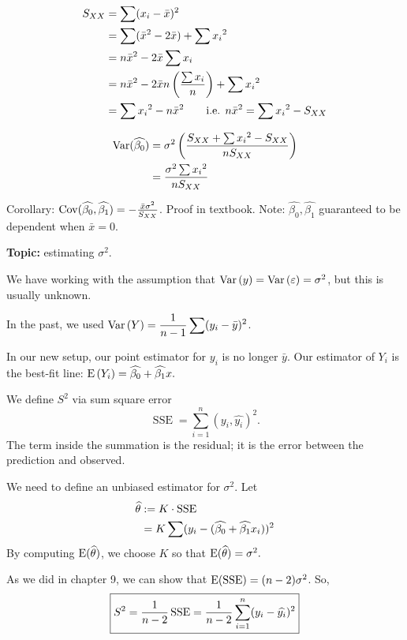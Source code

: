 \begin{align*}
    S_{XX} &= \sum (x_i - \bar x)^2\\
    &= \sum(\bar x^2 - 2 \bar x) + \sum {x_i}^2\\
    &= n \bar x^2 - 2\bar x \sum x_i\\
    &= n \bar x^2 - 2 \bar x n \pfrac{\sum x_i}{n} + \sum {x_i}^2\\
    &= \sum {x_i}^2 - n \bar x^2 \qquad \text{i.e. } n \bar x^2 = \sum {x_i}^2 - S_{XX}
\end{align*}

\begin{align*}
    \Var*{\widehat{\beta_0}} &= \sigma^2 \pfrac{S_{XX} + \sum {x_i}^2 - S_{XX}}{n S_{XX}}\\
    &= \frac{\sigma^2 \sum {x_i}^2}{n S_{XX}}
\end{align*}

\nl Corollary: $\operatorname{Cov} (\widehat{\beta_0}, \widehat{\beta_1}) = - \frac{\bar x \sigma^2}{S_{XX}}$. Proof in textbook. Note: $\widehat{\beta_0}, \widehat{\beta_1}$ guaranteed to be dependent when $\bar x=0$.

\nnl \textbf{Topic: } estimating $\sigma^2$.

\nl We have working with the assumption that $\Var y = \Var{\varepsilon} = \sigma^2$, but this is usually unknown.

\nl In the past, we used $\displaystyle \Var Y = \over{n-1} \sum (y_i - \bar y)^2$.

\nl In our new setup, our point estimator for $y_i$ is no longer $\bar y$. Our estimator of $Y_i$ is the best-fit line: $\E{Y_i} = \widehat{\beta_0} + \widehat{\beta_1}x.$

\nl We define $S^2$ via sum square error
$$\operatorname{SSE} = \sum_{i=1}^n (y_i, \widehat{y_i})^2.$$
The term inside the summation is the residual; it is the error between the prediction and observed.

\nl We need to define an unbiased estimator for $\sigma^2$. Let 
\begin{align*}
    \widehat{\theta} &:= K \cdot \operatorname{SSE} \\
    &= K \sum (y_i - (\widehat{\beta_0} + \widehat{\beta_1}x_i))^2
\end{align*}
By computing $\E*{\that}$, we choose $K$ so that $\E*{\that} = \sigma^2.$

\nl As we did in chapter 9, we can show that $\E*{\operatorname{SSE}} = (n-2) \sigma^2$. So, 
$$\boxed{S^2 = \over{n-2} \operatorname{SSE} = \over{n-2} \sum_{i=1}^n (y_i - \widehat{y_i})^2}$$

